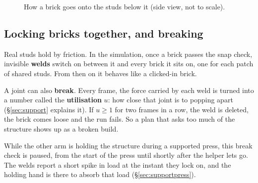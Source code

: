 \documentclass[11pt,a4paper]{article}
\newcommand{\brick}[3]{%
  \fill[#3] (#1,#2) rectangle ++(3.2,0.96); \draw (#1,#2) rectangle ++(3.2,0.96);
  \foreach \sx in {0.4,1.2,2.0,2.8} {\fill[#3] (#1+\sx-0.22,#2+0.96) rectangle ++(0.44,0.17); \draw (#1+\sx-0.22,#2+0.96) rectangle ++(0.44,0.17);}}
\begin{document}
\begin{figure}[H]
\centering
{}
\caption{How a brick goes onto the studs below it (side view, not to scale).}
\label{fig:studfit}
\end{figure}

\subsection{Locking bricks together, and breaking}

Real studs hold by friction. In the simulation, once a brick passes the snap
check, invisible \textbf{welds} switch on between it and every brick it sits on,
one for each patch of shared studs. From then on it behaves like a clicked-in
brick.

A joint can also \textbf{break}. Every frame, the force carried by each weld is
turned into a number called the \textbf{utilisation} $u$: how close that joint is to
popping apart (\S\ref{sec:support} explains it). If $u\ge 1$ for two frames in a
row, the weld is deleted, the brick comes loose and the run fails. So a plan
that asks too much of the structure shows up as a broken build.

While the other arm is holding the structure during a supported press, this
break check is paused, from the start of the press until shortly after the
helper lets go. The welds report a short spike in load at the instant they lock
on, and the holding hand is there to absorb that load
(\S\ref{sec:supportpress}).
\end{document}
